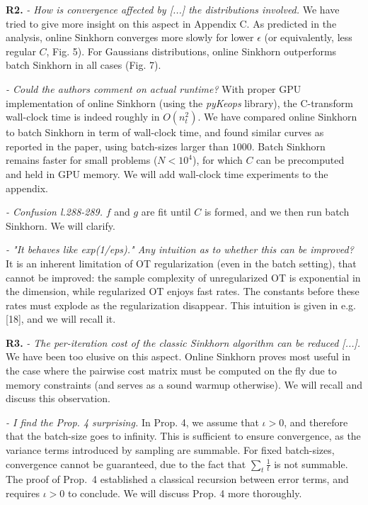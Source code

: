 \documentclass{article}
\begin{document}
\textbf{R2.} \textit{- How is convergence affected by [...] the distributions involved.} We have tried to give more insight on this aspect in Appendix C. As predicted in the analysis, online Sinkhorn converges more slowly for lower $\epsilon$ (or equivalently, less regular $C$, Fig. 5). For Gaussians distributions, online Sinkhorn outperforms batch Sinkhorn in all cases (Fig. 7).

\textit{- Could the authors comment on actual runtime?} With proper GPU
implementation of online Sinkhorn (using the \textit{pyKeops} library), the C-transform wall-clock time is indeed roughly in $O(n_t^2) $. We have compared
online Sinkhorn to batch Sinkhorn in term of wall-clock time, and found similar
curves as reported in the paper, using batch-sizes larger than $1000$. Batch Sinkhorn
remains faster for small problems ($N < 10^4$), for which $C$ can be precomputed and
held in GPU memory. We will add wall-clock time experiments to the appendix.

\textit{- Confusion l.288-289.} $f$ and $g$ are fit until $C$ is formed, and we then run batch Sinkhorn. We will clarify.

\textit{- "It behaves like exp(1/eps)." Any intuition as to whether this can be improved?}
It is an inherent limitation of OT regularization (even in the batch setting), that cannot be improved: the sample complexity of unregularized OT is exponential in the dimension, while regularized OT enjoys fast rates. The constants before these rates must explode as the regularization disappear. This intuition is given in e.g. [18], and we will recall it.

\textbf{R3.} 
\textit{- The per-iteration cost of the classic Sinkhorn algorithm can
be reduced [...].} We have been too elusive on this aspect. Online Sinkhorn proves most useful in the case where the
pairwise cost matrix must be computed on the fly due to memory constraints (and serves as a sound warmup otherwise). We will recall and discuss this observation.

\textit{- I find the Prop. 4 surprising.} In Prop. 4, we assume that $\iota > 0$,
and therefore that the batch-size goes to infinity. This is sufficient to ensure
convergence, as the variance terms introduced by sampling are summable. For
fixed batch-sizes, convergence cannot be guaranteed, due to the fact that
$\sum_t \frac{1}{t}$ is not summable. The proof of Prop.~4 established a
classical recursion between error terms, and requires $\iota > 0$ to conclude.
We will discuss Prop. 4 more thoroughly.
\end{document}
